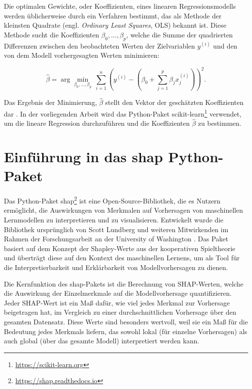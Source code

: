 Die optimalen Gewichte, oder Koeffizienten, eines linearen Regressionsmodells werden üblicherweise durch ein Verfahren bestimmt, 
das als Methode der kleinsten Quadrate (engl. \textit{Ordinary Least Squares}, OLS) bekannt ist. 
Diese Methode sucht die Koeffizienten \( \beta_0, \ldots, \beta_p \), welche die Summe der quadrierten 
Differenzen zwischen den beobachteten Werten der Zielvariablen \( y^{(i)} \) und den von dem Modell 
vorhergesagten Werten minimieren:

\begin{equation}
    \hat{\beta} = \arg \underset{\beta_0, \ldots, \beta_p}{\min} \ \sum_{i=1}^{n} \left( y^{(i)} - \left( \beta_0 + \sum_{j=1}^{p} \beta_j x_j^{(i)}\right)\right)^2.
\end{equation}

Das Ergebnis der Minimierung, \( \hat{\beta} \) stellt den Vektor der geschätzten Koeffizienten dar \cite[S. 37]{Molnar_2022}. 
In der vorliegenden Arbeit wird das Python-Paket \textsf{scikit-learn}\footnote{\url{https://scikit-learn.org}} verwendet, um die lineare Regression durchzuführen und die Koeffizienten 
\( \hat{\beta} \) zu bestimmen. 


\section{Einführung in das \textsf{shap} Python-Paket}

Das Python-Paket \textsf{shap}\footnote{\url{https://shap.readthedocs.io}} ist eine Open-Source-Bibliothek, die es Nutzern ermöglicht, 
die Auswirkungen von Merkmalen auf Vorhersagen von maschinellen Lernmodellen zu interpretieren und zu visualisieren. 
Entwickelt wurde die Bibliothek ursprünglich von Scott Lundberg und weiteren Mitwirkenden im Rahmen der Forschungsarbeit 
an der University of Washington \cite{NIPS2017_8a20a862}. Das Paket basiert auf dem Konzept der Shapley-Werte aus der kooperativen Spieltheorie 
und überträgt diese auf den Kontext des maschinellen Lernens, um als Tool für die Interpretierbarkeit und Erklärbarkeit 
von Modellvorhersagen zu dienen.

Die Kernfunktion des \textsf{shap}-Pakets ist die Berechnung von SHAP-Werten, welche die Auswirkung der 
Einzelmerkmale auf die Modellvorhersage quantifizieren. Jeder SHAP-Wert ist ein Maß dafür, wie viel jedes Merkmal 
zur Vorhersage beigetragen hat, im Vergleich zu einer durchschnittlichen Vorhersage über den gesamten Datensatz. 
Diese Werte sind besonders wertvoll, weil sie ein Maß für die Bedeutung jedes Merkmals liefern, 
das sowohl lokal (für einzelne Vorhersagen) als auch global (über das gesamte Modell) interpretiert werden kann.

